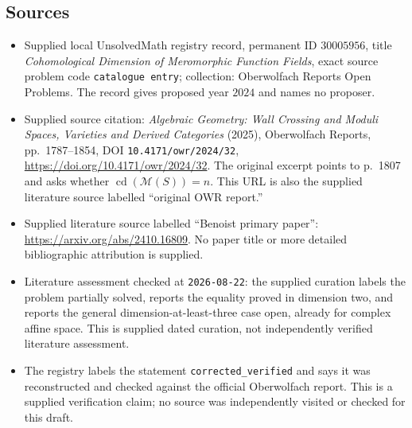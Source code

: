\documentclass[11pt]{article}
\begin{document}
\subsection{Sources}
\begin{itemize}
\item Supplied local UnsolvedMath registry record, permanent ID \(30005956\), title \emph{Cohomological Dimension of Meromorphic Function Fields}, exact source problem code \texttt{catalogue entry}; collection: Oberwolfach Reports Open Problems. The record gives proposed year \(2024\) and names no proposer.
\item Supplied source citation: \emph{Algebraic Geometry: Wall Crossing and Moduli Spaces, Varieties and Derived Categories} (2025), Oberwolfach Reports, pp.\ 1787--1854, DOI \texttt{10.4171/owr/2024/32}, \url{https://doi.org/10.4171/owr/2024/32}. The original excerpt points to p.\ 1807 and asks whether \(\operatorname{cd}(\mathcal M(S))=n\). This URL is also the supplied literature source labelled ``original OWR report.''
\item Supplied literature source labelled ``Benoist primary paper'': \url{https://arxiv.org/abs/2410.16809}. No paper title or more detailed bibliographic attribution is supplied.
\item Literature assessment checked at \texttt{2026-08-22}: the supplied curation labels the problem partially solved, reports the equality proved in dimension two, and reports the general dimension-at-least-three case open, already for complex affine space. This is supplied dated curation, not independently verified literature assessment.
\item The registry labels the statement \texttt{corrected\_verified} and says it was reconstructed and checked against the official Oberwolfach report. This is a supplied verification claim; no source was independently visited or checked for this draft.
\end{itemize}
\end{document}
